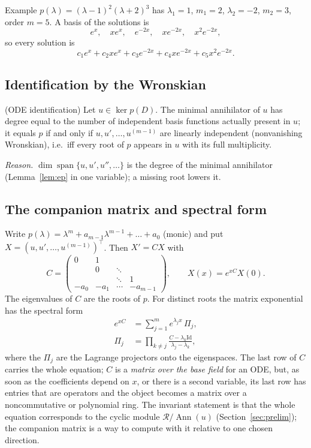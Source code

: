 \documentclass[11pt,a4paper]{article}
\theoremstyle{definition}
\newcommand{\Ann}{\operatorname{Ann}}
\newcommand{\ring}{\mathcal{R}}
\newcommand{\Id}{\mathrm{Id}}
\DeclareMathOperator{\spn}{span}
\DeclareMathOperator{\dimc}{dim}
\begin{document}
\begin{aside}{Example}
$p(\lambda)=(\lambda-1)^2(\lambda+2)^3$ has $\lambda_1=1$, $m_1=2$, $\lambda_2=-2$, $m_2=3$, order $m=5$. A basis of the solutions is
\[
e^{x},\quad xe^{x},\quad e^{-2x},\quad xe^{-2x},\quad x^2e^{-2x},
\]
so every solution is
\[
c_1e^{x}+c_2xe^{x}+c_3e^{-2x}+c_4xe^{-2x}+c_5x^2e^{-2x}.
\]
\end{aside}

\subsection{Identification by the Wronskian}
\begin{proposition}{(ODE identification)}
Let $u\in\ker p(D)$. The minimal annihilator of $u$ has degree equal to the number of independent basis functions actually present in $u$; it equals $p$ if and only if $u,u',\dots,u^{(m-1)}$ are linearly independent (nonvanishing Wronskian), i.e.\ iff every root of $p$ appears in $u$ with its full multiplicity.
\end{proposition}
\emph{Reason.} $\dimc\spn\{u,u',u'',\dots\}$ is the degree of the minimal annihilator (Lemma~\ref{lem:ep} in one variable); a missing root lowers it.

\subsection{The companion matrix and spectral form}
Write $p(\lambda)=\lambda^m+a_{m-1}\lambda^{m-1}+\dots+a_0$ (monic) and put $X=(u,u',\dots,u^{(m-1)})^{\top}$. Then $X'=CX$ with
\[
C=\begin{pmatrix}0&1&&\\&0&\ddots&\\&&\ddots&1\\-a_0&-a_1&\cdots&-a_{m-1}\end{pmatrix},\qquad
X(x)=e^{xC}X(0).
\]
The eigenvalues of $C$ are the roots of $p$. For distinct roots the matrix exponential has the spectral form
\begin{equation}\label{eq:spectral}
\begin{aligned}
e^{xC}&=\sum_{j=1}^me^{\lambda_jx}\,\Pi_j,\\
\Pi_j&=\prod_{k\ne j}\frac{C-\lambda_k\Id}{\lambda_j-\lambda_k},
\end{aligned}
\end{equation}
where the $\Pi_j$ are the Lagrange projectors onto the eigenspaces. The last row of $C$ carries the whole equation; $C$ is a \emph{matrix over the base field} for an ODE, but, as soon as the coefficients depend on $x$, or there is a second variable, its last row has entries that are operators and the object becomes a matrix over a noncommutative or polynomial ring. The invariant statement is that the whole equation corresponds to the cyclic module $\ring/\Ann(u)$ (Section~\ref{sec:prelim}); the companion matrix is a way to compute with it relative to one chosen direction.
\end{document}
